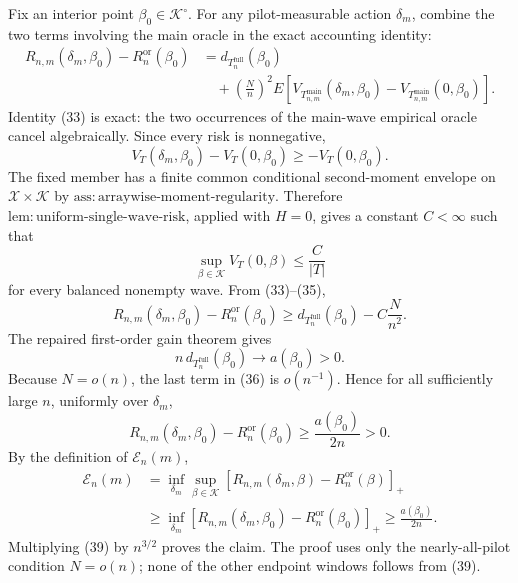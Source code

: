 Fix an interior point \(\beta_0\in\mathcal K^\circ\).  For any pilot-measurable action \(\delta_m\), combine the two terms involving the main oracle in the exact accounting identity:
\[
\begin{aligned}
R_{n,m}(\delta_m,\beta_0)-R_n^{\mathrm{or}}(\beta_0)
&=d_{T_n^{\mathrm{full}}}(\beta_0)\\
&\quad+\left(\frac Nn\right)^2E\!\left[
V_{T_{n,m}^{\mathrm{main}}}(\delta_m,\beta_0)
-V_{T_{n,m}^{\mathrm{main}}}(0,\beta_0)
\right].
\end{aligned}
\tag{33}
\]
Identity (33) is exact: the two occurrences of the main-wave empirical oracle cancel algebraically.  Since every risk is nonnegative,
\[
V_T(\delta_m,\beta_0)-V_T(0,\beta_0)
\geq -V_T(0,\beta_0).
\tag{34}
\]
The fixed member has a finite common conditional second-moment envelope on
\(\mathcal X\times\mathcal K\) by
\(\mathrm{ass{:}arraywise\text{-}moment\text{-}regularity}\).  Therefore
\(\mathrm{lem{:}uniform\text{-}single\text{-}wave\text{-}risk}\), applied with \(H=0\), gives a constant \(C<\infty\) such that
\[
\sup_{\beta\in\mathcal K}V_T(0,\beta)\leq\frac C{|T|}
\tag{35}
\]
for every balanced nonempty wave.  From (33)--(35),
\[
R_{n,m}(\delta_m,\beta_0)-R_n^{\mathrm{or}}(\beta_0)
\geq d_{T_n^{\mathrm{full}}}(\beta_0)-C\frac N{n^2}.
\tag{36}
\]
The repaired first-order gain theorem gives
\[
n\,d_{T_n^{\mathrm{full}}}(\beta_0)\longrightarrow a(\beta_0)>0.
\tag{37}
\]
Because \(N=o(n)\), the last term in (36) is \(o(n^{-1})\).  Hence for all sufficiently large \(n\), uniformly over \(\delta_m\),
\[
R_{n,m}(\delta_m,\beta_0)-R_n^{\mathrm{or}}(\beta_0)
\geq\frac{a(\beta_0)}{2n}>0.
\tag{38}
\]
By the definition of \(\mathcal E_n(m)\),
\[
\begin{aligned}
\mathcal E_n(m)
&=\inf_{\delta_m}\sup_{\beta\in\mathcal K}
\left[R_{n,m}(\delta_m,\beta)-R_n^{\mathrm{or}}(\beta)\right]_+\\
&\geq
\inf_{\delta_m}
\left[R_{n,m}(\delta_m,\beta_0)-R_n^{\mathrm{or}}(\beta_0)\right]_+
\geq\frac{a(\beta_0)}{2n}.
\end{aligned}
\tag{39}
\]
Multiplying (39) by \(n^{3/2}\) proves the claim.  The proof uses only the nearly-all-pilot condition \(N=o(n)\); none of the other endpoint windows follows from (39).

